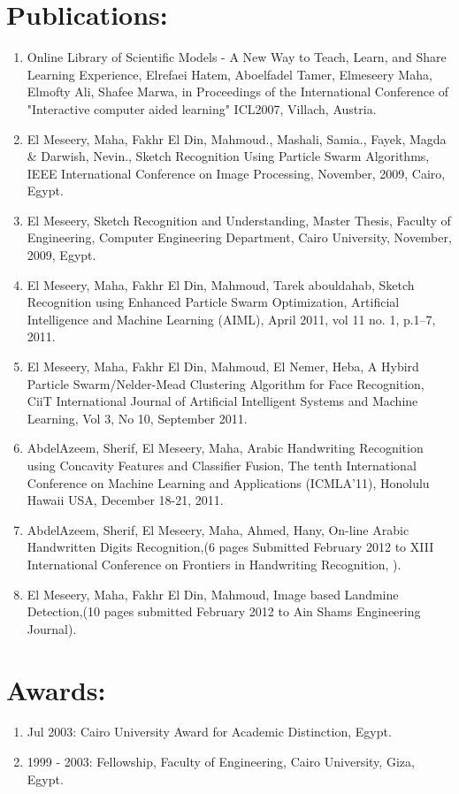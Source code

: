 \documentclass{article}
\begin{document}
 \section*{Publications:}
 \begin{enumerate}
  \item Online Library of Scientific Models - A New Way to Teach, Learn, and Share Learning Experience, Elrefaei Hatem, Aboelfadel Tamer, Elmeseery Maha, Elmofty Ali, Shafee Marwa, in Proceedings of the International Conference of "Interactive computer aided learning" ICL2007, Villach, Austria.\textbf{\underbar{}}
  \item El Meseery, Maha, Fakhr El Din, Mahmoud., Mashali, Samia., Fayek, Magda \& Darwish, Nevin., Sketch Recognition Using Particle Swarm Algorithms,  IEEE International Conference on Image Processing, November,  2009, Cairo, Egypt.
  \item El Meseery, Sketch Recognition and Understanding,  Master Thesis, Faculty of Engineering, Computer Engineering Department, Cairo University, November, 2009, Egypt.
  \item El Meseery, Maha, Fakhr El Din, Mahmoud, Tarek abouldahab, Sketch Recognition using Enhanced Particle Swarm Optimization, Artificial Intelligence and Machine Learning (AIML), April 2011, vol 11 no. 1, p.1--7, 2011.
\item El Meseery, Maha, Fakhr El Din, Mahmoud,  El Nemer, Heba,  A Hybird Particle Swarm/Nelder-Mead Clustering Algorithm for Face Recognition, CiiT International Journal of Artificial Intelligent Systems and Machine Learning, Vol 3, No 10, September 2011. 
\item AbdelAzeem, Sherif, El Meseery, Maha, Arabic Handwriting Recognition using Concavity Features and Classifier Fusion, The tenth International Conference on Machine Learning and Applications (ICMLA'11),  Honolulu Hawaii USA, December 18-21, 2011. 
  \item AbdelAzeem, Sherif, El Meseery, Maha, Ahmed, Hany, On-line Arabic Handwritten Digits Recognition,(6 pages Submitted February 2012 to XIII International Conference on Frontiers in Handwriting Recognition, ).
\item El Meseery, Maha, Fakhr El Din, Mahmoud, Image based Landmine Detection,(10 pages submitted  February 2012 to Ain Shams Engineering Journal).
\end{enumerate}
 \section*{Awards:}
  \begin{enumerate}
    \item Jul 2003: Cairo University Award for Academic Distinction, Egypt.
	\item 1999 - 2003: Fellowship, Faculty of Engineering, Cairo University, Giza,
	Egypt.
  \end{enumerate}
\end{document}
